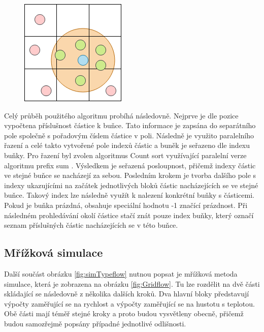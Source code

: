 \begin{figure}[hbt]
	\centering
	\captionsetup{justification=centering}
	\includegraphics[scale=0.6]{obrazky-figures/GridSPH.png}
	\label{fig:GridSPH}
\end{figure}

Celý průběh použitého algoritmu probíhá následovně. Nejprve je dle pozice vypočtena příslušnost částice k buňce. Tato informace je zapsána do separátního pole společně s pořadovým číslem částice v poli. Následně je využito paralelního řazení a celé takto vytvořené pole indexů částic a buněk je seřazeno dle indexu buňky. Pro řazení byl zvolen algoritmus Count sort \cite{CountSortGPU} využívající paralelní verze algoritmu prefix sum \cite{GPUGemsPrefixSum}. Výsledkem je seřazená posloupnost, přičemž indexy částic ve stejné buňce se nacházejí za sebou. Posledním krokem je tvorba dalšího pole s indexy ukazujícími na začátek jednotlivých bloků částic nacházejících se ve stejné buňce. Takový index lze následně využít k nalezení konkrétní buňky s částicemi. Pokud je buňka prázdná, obsahuje speciální hodnotu -1 značící prázdnost. Při následném prohledávání okolí částice stačí znát pouze index buňky, který označí seznam příslušných částic nacházejících se v této buňce.

\subsection{Mřížková simulace}
\label{chapter:simGrid}
Další součást obrázku \ref{fig:simTypeflow} nutnou popsat je mřížková metoda simulace, která je zobrazena na obrázku \ref{fig:Gridflow}. Tu lze rozdělit na dvě části skládající se následovně z několika dalších kroků. Dva hlavní bloky představují výpočty zaměřující se na rychlost a výpočty zaměřující se na hustotu s teplotou. Obě části mají téměř stejné kroky a proto budou vysvětleny obecně, přičemž budou samozřejmě popsány případné jednotlivé odlišnosti.

